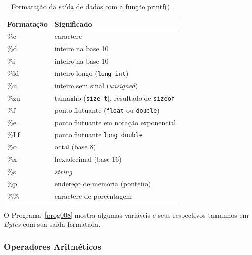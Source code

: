 \documentclass[11pt,fleqn]{book} %
\begin{document}
\begin{table}[ht]
	\centering
	\caption{Formatação da saída de dados com a função printf().}
	\label{tab:printf}
		\begin{tabular}{@{}ll@{}}
			\toprule
			Formatação & Significado                        \\ \midrule
			\%c        & caractere                          \\
			\%d        & inteiro na base 10                 \\
			\%i        & inteiro na base 10                 \\
			\%ld       & inteiro longo (\texttt{long int})  \\
			\%u        & inteiro sem sinal (\textit{unsigned}) \\
			\%zu       & tamanho (\texttt{size\_t}), resultado de \texttt{sizeof} \\
			\%f        & ponto flutuante (\texttt{float} ou \texttt{double}) \\
			\%e        & ponto flutuante em notação exponencial \\
			\%Lf       & ponto flutuante \texttt{long double} \\
			\%o        & octal (base 8)                     \\
			\%x        & hexadecimal (base 16)              \\
			\%s        & \textit{string}                    \\
			\%p        & endereço de memória (ponteiro)     \\
			\%\%       & caractere de porcentagem           \\ \bottomrule
		\end{tabular}%
\end{table}

O Programa~\ref{prog008}  mostra algumas variáveis e seus respectivos tamanhos em \textit{Bytes} com sua saída formatada.



\subsubsection{Operadores Aritméticos}
\end{document}
